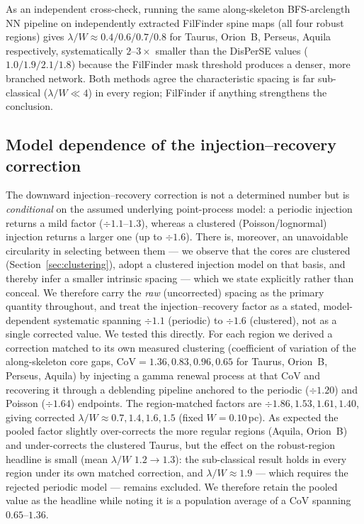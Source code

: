 \documentclass[usenatbib,twoside,twocolumn]{mnras}
\begin{document}
As an independent cross-check, running the same along-skeleton BFS-arclength NN pipeline on independently extracted FilFinder spine maps (all four robust regions) gives $\lambda/W\approx0.4/0.6/0.7/0.8$ for Taurus, Orion~B, Perseus, Aquila respectively, systematically $2$--$3\times$ smaller than the DisPerSE values ($1.0/1.9/2.1/1.8$) because the FilFinder mask threshold produces a denser, more branched network. Both methods agree the characteristic spacing is far sub-classical ($\lambda/W\ll4$) in every region; FilFinder if anything strengthens the conclusion.

\subsection{Model dependence of the injection--recovery correction}
\label{sec:injection_recovery_model}
The downward injection--recovery correction is not a determined number but is \emph{conditional} on the assumed underlying point-process model: a periodic injection returns a mild factor ($\div1.1$--$1.3$), whereas a clustered (Poisson/lognormal) injection returns a larger one (up to $\div1.6$). There is, moreover, an unavoidable circularity in selecting between them --- we observe that the cores are clustered (Section~\ref{sec:clustering}), adopt a clustered injection model on that basis, and thereby infer a smaller intrinsic spacing --- which we state explicitly rather than conceal. We therefore carry the \emph{raw} (uncorrected) spacing as the primary quantity throughout, and treat the injection--recovery factor as a stated, model-dependent systematic spanning $\div1.1$ (periodic) to $\div1.6$ (clustered), not as a single corrected value. We tested this directly. For each region we derived a correction matched to its own measured clustering (coefficient of variation of the along-skeleton core gaps, CoV$=1.36,0.83,0.96,0.65$ for Taurus, Orion~B, Perseus, Aquila) by injecting a gamma renewal process at that CoV and recovering it through a deblending pipeline anchored to the periodic ($\div1.20$) and Poisson ($\div1.64$) endpoints. The region-matched factors are $\div1.86,1.53,1.61,1.40$, giving corrected $\lambda/W\approx0.7,1.4,1.6,1.5$ (fixed $W=0.10$\,pc). As expected the pooled factor slightly over-corrects the more regular regions (Aquila, Orion~B) and under-corrects the clustered Taurus, but the effect on the robust-region headline is small (mean $\lambda/W$ $1.2\to1.3$): the sub-classical result holds in every region under its own matched correction, and $\lambda/W\approx1.9$ --- which requires the rejected periodic model --- remains excluded. We therefore retain the pooled value as the headline while noting it is a population average of a CoV spanning $0.65$--$1.36$.
\end{document}
